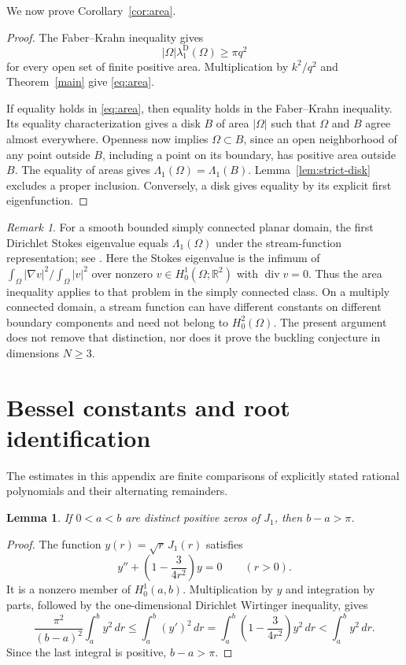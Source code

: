 \documentclass[11pt]{article}
\newtheorem{lemma}[theorem]{Lemma}
\theoremstyle{remark}
\newtheorem{remark}[theorem]{Remark}
\begin{document}
We now prove Corollary~\ref{cor:area}.
\begin{proof}
The Faber--Krahn inequality \cite{Faber,Krahn} gives
\[
 |\Omega|\lambda_1^{\mathrm D}(\Omega)\ge\pi q^2
\]
for every open set of finite positive area. Multiplication by $k^2/q^2$
and Theorem~\ref{main} give \eqref{eq:area}.

If equality holds in \eqref{eq:area}, then equality holds in the
Faber--Krahn inequality. Its equality characterization gives a disk $B$
of area $|\Omega|$ such that $\Omega$ and $B$ agree almost everywhere.
Openness now implies $\Omega\subset B$, since an open
neighborhood of any point outside $B$, including a point on its
boundary, has positive area outside $B$.
The equality of areas gives $\Lambda_1(\Omega)=\Lambda_1(B)$.
Lemma~\ref{lem:strict-disk} excludes a proper inclusion. Conversely,
a disk gives equality by its explicit first eigenfunction.
\end{proof}

\begin{remark}
For a smooth bounded simply connected planar domain, the first
Dirichlet Stokes eigenvalue equals $\Lambda_1(\Omega)$ under the
stream-function representation; see \cite[Remark~1]{HMP}.
Here the Stokes eigenvalue is the infimum of
$\int_\Omega|\nabla v|^2/\int_\Omega|v|^2$ over nonzero
$v\in H_0^1(\Omega;\mathbb R^2)$ with $\operatorname{div}v=0$.
Thus the area inequality applies to that
problem in the simply connected class. On a multiply connected
domain, a stream function can have different constants on different
boundary components and need not belong to $H_0^2(\Omega)$.
The present argument does not remove that distinction, nor does it
prove the buckling conjecture in dimensions $N\ge3$.
\end{remark}
\appendix
\section{Bessel constants and root identification}\label{app:constants}
The estimates in this appendix are finite comparisons of explicitly
stated rational polynomials and their alternating remainders.

\begin{lemma}
\label{subm:J1-separation}
If $0<a<b$ are distinct positive zeros of $J_1$, then $b-a>\pi$.
\end{lemma}
\begin{proof}
The function $y(r)=\sqrt r\,J_1(r)$ satisfies
\[
 y''+\left(1-\frac{3}{4r^2}\right)y=0\qquad(r>0).
\]
It is a nonzero member of $H_0^1(a,b)$.  Multiplication by $y$ and
integration by parts, followed by the one-dimensional Dirichlet
Wirtinger inequality, gives
\[
 \frac{\pi^2}{(b-a)^2}\int_a^b y^2\,dr
 \le\int_a^b(y')^2\,dr
 =\int_a^b\left(1-\frac{3}{4r^2}\right)y^2\,dr
 <\int_a^b y^2\,dr.
\]
Since the last integral is positive, $b-a>\pi$.
\end{proof}
\end{document}
